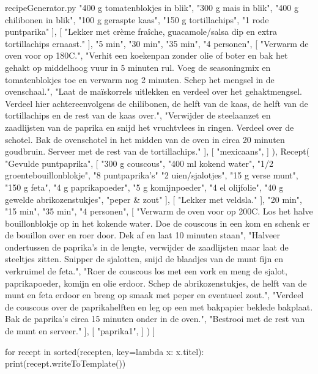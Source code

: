 \begin{filecontents*}{recipeGenerator.py}
		"400 g tomatenblokjes in blik",
		"300 g mais in blik",
		"400 g chilibonen in blik",
		"100 g geraspte kaas",
		"150 g tortillachips",
		"1 rode puntparika"
	],
	[
		"Lekker met crème fraîche, guacamole/salsa dip en extra tortillachips ernaast."
	],
	"5 min",
	"30 min",
	"35 min",
	"4 personen",
	[
		"Verwarm de oven voor op 180\degree C.",
		"Verhit een koekenpan zonder olie of boter en bak het gehakt op middelhoog vuur in 5 minuten rul. Voeg de seasoningmix en tomatenblokjes toe en verwarm nog 2 minuten. Schep het mengsel in de ovenschaal.",
		"Laat de maïskorrels uitlekken en verdeel over het gehaktmengsel. Verdeel hier achtereenvolgens de chilibonen, de helft van de kaas, de helft van de tortillachips en de rest van de kaas over.",
		"Verwijder de steelaanzet en zaadlijsten van de paprika en snijd het vruchtvlees in ringen. Verdeel over de schotel. Bak de ovenschotel in het midden van de oven in circa 20 minuten goudbruin. Serveer met de rest van de tortillachips."
	],
	[
	"mexicaans",
	]
),
Recept(
	"Gevulde puntpaprika",
	[
		"300 g couscous",
		"400 ml kokend water",
		"1/2 groentebouillonblokje",
		"8 puntpaprika's"
		"2 uien/sjalotjes",
		"15 g verse munt",
		"150 g feta",
		"4 g paprikapoeder",
		"5 g komijnpoeder",
		"4 el olijfolie",
		"40 g gewelde abrikozenstukjes",
		"peper \& zout"
	],
	[
		"Lekker met veldsla."
	],
	"20 min",
	"15 min",
	"35 min",
	"4 personen",
	[
		"Verwarm de oven voor op 200\degree C. Los het halve bouillonblokje op in het kokende water. Doe de couscous in een kom en schenk er de bouillon over en roer door. Dek af en laat 10 minuten staan",
		"Halveer ondertussen de paprika’s in de lengte, verwijder de zaadlijsten maar laat de steeltjes zitten. Snipper de sjalotten, snijd de blaadjes van de munt fijn en verkruimel de feta.",
		"Roer de couscous los met een vork en meng de sjalot, paprikapoeder, komijn en olie erdoor. Schep de abrikozenstukjes, de helft van de munt en feta erdoor en breng op smaak met peper en eventueel zout.",
		"Verdeel de couscous over de paprikahelften en leg op een met bakpapier beklede bakplaat. Bak de paprika’s circa 15 minuten onder in de oven.",
		"Bestrooi met de rest van de munt en serveer."
	],
	[
	"paprika1",
	]
)
]

for recept in sorted(recepten, key=lambda x: x.titel):
     print(recept.writeToTemplate())

\end{filecontents*}

